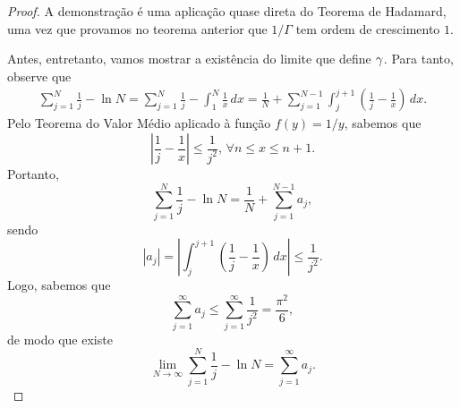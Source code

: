     \begin{proof}
        A demonstração é uma aplicação quase direta do Teorema de Hadamard, uma vez que provamos
        no teorema anterior que $1/\Gamma$ tem ordem de crescimento $1$.
        
        Antes, entretanto, vamos mostrar a existência do limite que define $\gamma$. Para tanto,
        observe que
        \begin{align*}
            \sum_{j=1}^N \frac{1}{j} - \ln N 
            = \sum_{j=1}^N \frac{1}{j} - \int_1^N \frac{1}{x} \, dx
            = \frac{1}{N} + \sum_{j=1}^{N-1} \int_j^{j+1} \left(\frac{1}{j} - \frac{1}{x}\right) \, dx.
        \end{align*}
        Pelo Teorema do Valor Médio aplicado à função $f(y) = 1/y$, sabemos que
        \[
        \left| \frac{1}{j} - \frac{1}{x} \right| \leq \frac{1}{j^2}, \, \forall n\leq x\leq n+1.
        \]
        Portanto,
        \[
        \sum_{j=1}^N \frac{1}{j} - \ln N = \frac{1}{N} + \sum_{j=1}^{N-1} a_j,
        \]
        sendo
        \[
        |a_j| = \left| \int_j^{j+1} \left(\frac{1}{j} - \frac{1}{x}\right) \, dx \right| \leq \frac{1}{j^2}.
        \]
        Logo, sabemos que
        \[
        \sum_{j=1}^{\infty} a_j \leq \sum_{j=1}^{\infty} \frac{1}{j^2} = \frac{\pi^2}{6},
        \]
        de modo que existe
        \[
        \lim_{N\to\infty} \sum_{j=1}^N \frac{1}{j} - \ln N = \sum_{j=1}^{\infty} a_j.
        \]
        

\end{proof}
